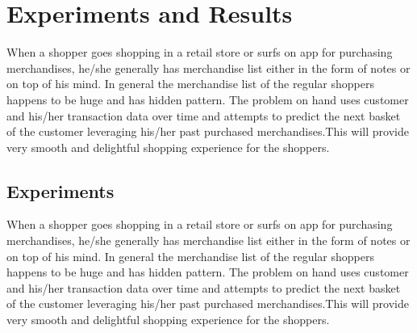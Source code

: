 \section{Experiments and Results}

When a shopper goes shopping in a retail store or surfs on app for purchasing merchandises, 
he/she generally has merchandise list either in the form of notes or on top of his mind. 
In general the merchandise list of the regular shoppers happens to be huge and has hidden pattern. 
The problem on hand uses customer and his/her transaction data over time and attempts to predict 
the next basket of the customer leveraging his/her past purchased merchandises.This will provide 
very smooth and delightful shopping experience for the shoppers.

\subsection{Experiments}
When a shopper goes shopping in a retail store or surfs on app for purchasing merchandises, 
he/she generally has merchandise list either in the form of notes or on top of his mind. 
In general the merchandise list of the regular shoppers happens to be huge and has hidden pattern. 
The problem on hand uses customer and his/her transaction data over time and attempts to predict 
the next basket of the customer leveraging his/her past purchased merchandises.This will provide 
very smooth and delightful shopping experience for the shoppers.